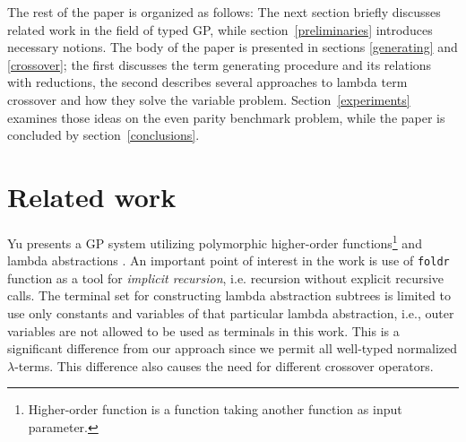 \documentclass{sig-alternate}
\newcommand{\lterms}{$\lambda$-terms\xspace}
\newcommand{\nehodi}[1]{{\color{yellow} #1}}
\begin{document}

The rest of the paper is organized as follows: The next section briefly discusses related work in the field of typed GP, while section~\ref{preliminaries} introduces necessary notions.
The body of the paper is presented in sections \ref{generating} and \ref{crossover}; the first discusses the term generating 
procedure and its relations
with reductions, the second describes several approaches to lambda term
crossover and how they solve the variable problem. Section~\ref{experiments} examines those ideas on the even parity benchmark problem, while the paper is concluded by section~\ref{conclusions}.

\section{Related work}
\label{related}

Yu presents a GP system utilizing
polymorphic higher-order functions\footnote{Higher-order 
function is a function taking another function as 
input parameter.} and lambda abstractions  \cite{yu01}.
An important point of interest in the work is use of
\texttt{foldr} function as a tool for \textit{implicit recursion}, i.e. recursion without explicit recursive calls. The terminal set for constructing lambda abstraction subtrees  is limited to use only constants and variables of that particular lambda abstraction, i.e., outer variables are not allowed to be used as terminals in this work. This is a significant difference from our approach since we permit all well-typed normalized \lterms. This difference also causes the need for different crossover operators.  
\end{document}
